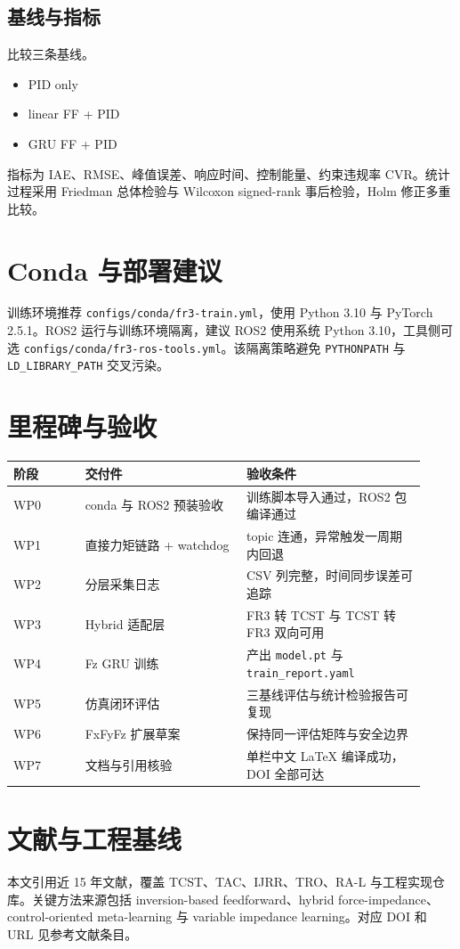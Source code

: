 \documentclass[11pt,a4paper]{article}
\begin{document}
\subsection{基线与指标}
比较三条基线。
\begin{itemize}[leftmargin=1.2em]
  \item PID only
  \item linear FF + PID
  \item GRU FF + PID
\end{itemize}

指标为 IAE、RMSE、峰值误差、响应时间、控制能量、约束违规率 CVR。统计过程采用 Friedman 总体检验与 Wilcoxon signed-rank 事后检验，Holm 修正多重比较。

\section{Conda 与部署建议}
训练环境推荐 \texttt{configs/conda/fr3-train.yml}，使用 Python 3.10 与 PyTorch 2.5.1。ROS2 运行与训练环境隔离，建议 ROS2 使用系统 Python 3.10，工具侧可选 \texttt{configs/conda/fr3-ros-tools.yml}。该隔离策略避免 \texttt{PYTHONPATH} 与 \texttt{LD\_LIBRARY\_PATH} 交叉污染。

\section{里程碑与验收}
\begin{longtable}{p{0.16\linewidth}p{0.36\linewidth}p{0.40\linewidth}}
\toprule
阶段 & 交付件 & 验收条件 \\
\midrule
WP0 & conda 与 ROS2 预装验收 & 训练脚本导入通过，ROS2 包编译通过 \\
WP1 & 直接力矩链路 + watchdog & topic 连通，异常触发一周期内回退 \\
WP2 & 分层采集日志 & CSV 列完整，时间同步误差可追踪 \\
WP3 & Hybrid 适配层 & FR3 转 TCST 与 TCST 转 FR3 双向可用 \\
WP4 & Fz GRU 训练 & 产出 \texttt{model.pt} 与 \texttt{train\_report.yaml} \\
WP5 & 仿真闭环评估 & 三基线评估与统计检验报告可复现 \\
WP6 & FxFyFz 扩展草案 & 保持同一评估矩阵与安全边界 \\
WP7 & 文档与引用核验 & 单栏中文 LaTeX 编译成功，DOI 全部可达 \\
\bottomrule
\end{longtable}

\section{文献与工程基线}
本文引用近 15 年文献，覆盖 TCST、TAC、IJRR、TRO、RA-L 与工程实现仓库。关键方法来源包括 inversion-based feedforward、hybrid force-impedance、control-oriented meta-learning 与 variable impedance learning。对应 DOI 和 URL 见参考文献条目\cite{lin2026pgg,xu2025hybridff,li2014annff,spiegel2024stableinversion,haddadin2024ufic,richards2023coml,buchli2011vic,li2025tro,iskandar2023ral,franka_ros2,franka_ign,franka_gz_sim}。



\end{document}
